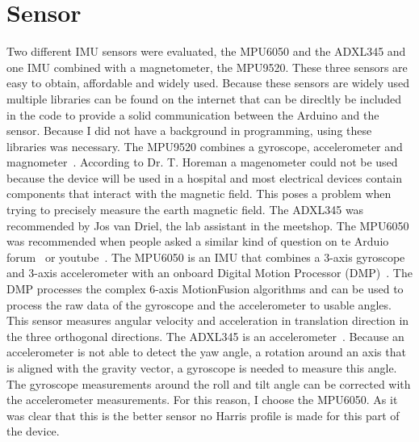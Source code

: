 \documentclass[whitelogo]{tudelft-report}
\begin{document}
{{{\section{Sensor}
Two different IMU sensors were evaluated, the MPU6050 and the ADXL345 and one IMU combined with a magnetometer, the MPU9520. These three sensors are easy to obtain, affordable and widely used. Because these sensors are widely used multiple libraries can be found on the internet that can be direcltly be included in the code to provide a solid communication between the Arduino and the sensor. Because I did not have a background in programming, using these libraries was necessary. The MPU9520 combines a gyroscope, accelerometer and magnometer~\cite{infineon:MPU9520}. According to Dr. T. Horeman a magenometer could not be used because the device will be used in a hospital and most electrical devices contain components that interact with the magnetic field. This poses a problem when trying to precisely measure the earth magnetic field. The ADXL345 was recommended by Jos van Driel, the lab assistant in the meetshop. The MPU6050 was recommended when people asked a similar kind of question on te Arduio forum~\cite{Arduinoforum} or youtube~\cite{JoopBrokking}. The MPU6050 is an IMU that combines a 3-axis gyroscope and 3-axis accelerometer with an onboard Digital Motion Processor (DMP)~\cite{lucena2018mastication}\cite{infineon:MPU6050}. The DMP processes the complex 6-axis MotionFusion algorithms and can be used to process the raw data of the gyroscope and the accelerometer to usable angles. This sensor measures angular velocity and acceleration in translation direction in the three orthogonal directions. The ADXL345 is an accelerometer~\cite{infineon:ADXL345}. Because an accelerometer is not able to detect the yaw angle, a rotation around an axis that is aligned with the gravity vector, a gyroscope is needed to measure this angle. The gyroscope measurements around the roll and tilt angle can be corrected with the accelerometer measurements. For this reason, I choose the MPU6050. As it was clear that this is the better sensor no Harris profile is made for this part of the device.

}}}
\end{document}
